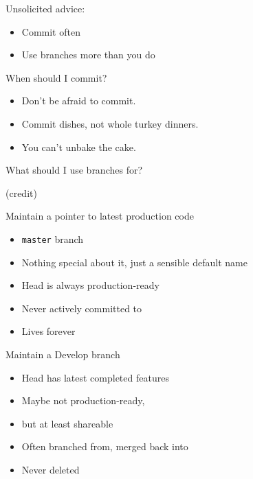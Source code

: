 \documentclass{beamer}
\begin{document}
\begin{frame}
Unsolicited advice:
\begin{itemize}
\item Commit often
\item Use branches more than you do
\end{itemize}

\end{frame}


\begin{frame}[plain]
When should I commit?
\end{frame}

\begin{frame}
  \begin{itemize}
  \item Don't be afraid to commit.
  \item Commit dishes, not whole turkey dinners.
  \item You can't unbake the cake.
  \end{itemize}
\end{frame}


\begin{frame}
What should I use branches for?  
\end{frame}


\begin{frame}
(credit)
\end{frame}

\begin{frame}

  Maintain a pointer to latest production code

  \begin{itemize}
  \item {\tt master} branch
  \item Nothing special about it, just a sensible default name
  \item Head is always production-ready
  \item Never actively committed to
  \item Lives forever
  \end{itemize}

\end{frame}

\begin{frame}

  Maintain a Develop branch

  \begin{itemize}
  \item Head has latest completed features
  \item Maybe not production-ready,
  \item but at least shareable
  \item Often branched from, merged back into
  \item Never deleted
  \end{itemize}

\end{frame}
\end{document}
